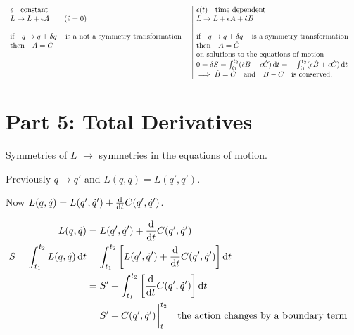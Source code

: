 \documentclass{article}
\begin{document}
\[
    \begin{array}{l|l}
        \epsilon \qq{constant}                                       & \epsilon(t)\qq{time dependent}                                                                                               \\
        L\to L+\epsilon A \qquad(\dot{\epsilon}=0)                   & L\to L+\epsilon A+\dot{\epsilon}B                                                                                            \\
                                                                     &                                                                                                                              \\
        \qif* q\to q+\var{q} \qq{is a not a symmetry transformation} & \qif* q\to q+\var{q} \qq{is a symmetry transformation}                                                                       \\
        \qthen*   A=\dot{C}                                          & \qthen*  A=\dot{C}                                                                                                           \\
                                                                     & \qq*{on solutions to the equations of motion}                                                                                \\
                                                                     & 0=\var{S}=\int_{t_1}^{t_2}(\dot{\epsilon}B+\epsilon \dot{C})\dd{t}=-\int_{t_1}^{t_2}(\epsilon\dot{B}+\epsilon \dot{C})\dd{t} \\
                                                                     & \implies  \dot{B}=\dot{C}\qand B-C \qq{is  conserved.}                                                                       \\
    \end{array}
\]


\section*{Part 5: Total Derivatives}
Symmetries of $L$ $\to$ symmetries in the equations of motion.

Previously $q\to q'$ and $L(q,\dot{q})=L(q',\dot{q}')$.

Now $L(q,\dot{q})=L(q',\dot{q}')+\dv{t}C(q',\dot{q}')$.


\begin{align*}
    L(q,\dot{q})                          & =L(q',\dot{q}')+\dv{t}C(q',\dot{q}')                                           \\
    S=\int_{t_1}^{t_2} L(q,\dot{q})\dd{t} & =\int_{t_1}^{t_2}\bqty{L(q',\dot{q}')+\dv{t}C(q',\dot{q}')}\dd{t}              \\
                                          & =S'+\int_{t_1}^{t_2}\bqty{\dv{t}C(q',\dot{q}')}\dd{t}                          \\
                                          & =S'+C(q',\dot{q}')\eval_{t_1}^{t_2} \qq{the action changes by a boundary term} \\
\end{align*}
\end{document}
